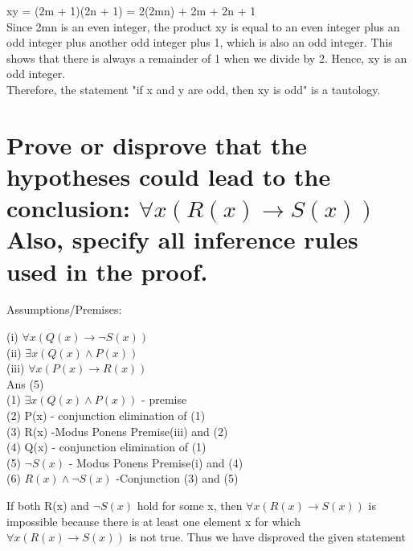 \documentclass{article}
\begin{document}
xy = (2m + 1)(2n + 1) = 2(2mn) + 2m + 2n + 1\\

Since 2mn is an even integer, the product xy is equal to an even integer plus an odd integer plus another odd integer plus 1, which is also an odd integer. This shows that there is always a remainder of 1 when we divide by 2. Hence, xy is an odd integer.\\

Therefore, the statement "if x and y are odd, then xy is odd" is a tautology.\\

\section{Prove or disprove that the hypotheses could lead to the conclusion: $\forall x (R(x)\rightarrow S(x))$
Also, specify all inference rules used in the proof.}

\Large Assumptions/Premises:

(i) $\forall x (Q(x)\rightarrow \neg S(x))$\\
(ii) $\exists x (Q(x)\land P(x))$\\
(iii) $\forall x (P(x)\rightarrow R(x))$\\

Ans (5)
\\
(1) $\exists x (Q(x)\land P(x))$ - premise\\ 
(2) P(x) - conjunction elimination of (1)\\
(3) R(x) -Modus Ponens Premise(iii) and (2)\\
(4) Q(x) - conjunction elimination of (1)\\
(5) $\neg S(x)$ - Modus Ponens Premise(i) and (4)\\
(6) $ R(x) \land \neg S(x)$ -Conjunction (3) and (5)

If both R(x) and $\neg S(x)$ hold for some x, then $\forall x (R(x)\rightarrow S(x))$ is impossible because there is at least one element x for which $\forall x (R(x)\rightarrow S(x))$ is not true.
Thus we have disproved the given statement

 
 



 
 
\end{document}
